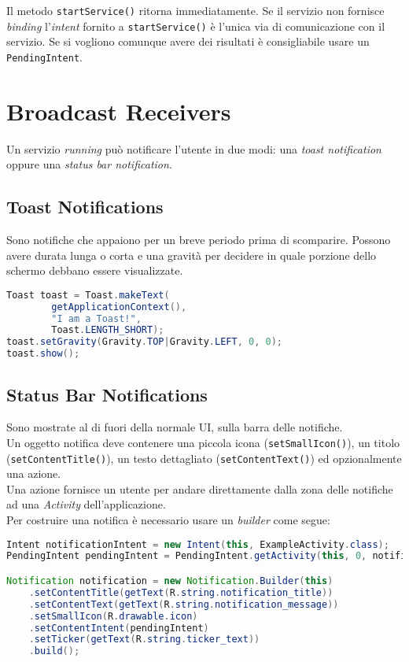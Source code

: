 Il metodo \texttt{startService()} ritorna immediatamente. Se il servizio non fornisce \textit{binding} l'\textit{intent} fornito a \texttt{startService()} è l'unica via di comunicazione con il servizio. Se si vogliono comunque avere dei risultati è consigliabile usare un \texttt{PendingIntent}.





\chapter{Broadcast Receivers}

Un servizio \textit{running} può notificare l'utente in due modi: una \textit{toast notification} oppure una \textit{status bar notification}.

\section{Toast Notifications}
Sono notifiche che appaiono per un breve periodo prima di scomparire. Possono avere durata lunga o corta e una gravità per decidere in quale porzione dello schermo debbano essere visualizzate.

\begin{lstlisting}[language=Java]
Toast toast = Toast.makeText(
		getApplicationContext(),
		"I am a Toast!",
		Toast.LENGTH_SHORT);
toast.setGravity(Gravity.TOP|Gravity.LEFT, 0, 0);
toast.show();
\end{lstlisting}


\section{Status Bar Notifications}
Sono mostrate al di fuori della normale UI, sulla barra delle notifiche.\\
Un oggetto notifica deve contenere una piccola icona (\texttt{setSmallIcon()}), un titolo (\texttt{setContentTitle()}), un testo dettagliato (\texttt{setContentText()}) ed opzionalmente una azione.\\
Una azione fornisce un utente per andare direttamente dalla zona delle notifiche ad una \textit{Activity} dell'applicazione.\\
Per costruire una notifica è necessario usare un \textit{builder} come segue:
\begin{lstlisting}[language=Java]
Intent notificationIntent = new Intent(this, ExampleActivity.class);
PendingIntent pendingIntent = PendingIntent.getActivity(this, 0, notificationIntent, 0);

Notification notification = new Notification.Builder(this)
    .setContentTitle(getText(R.string.notification_title))
    .setContentText(getText(R.string.notification_message))
    .setSmallIcon(R.drawable.icon)
    .setContentIntent(pendingIntent)
    .setTicker(getText(R.string.ticker_text))
    .build();

\end{lstlisting}

